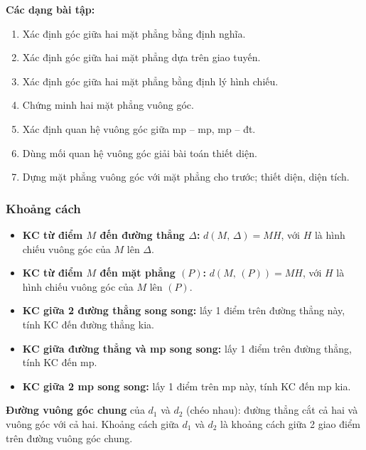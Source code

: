 \documentclass[12pt,a4paper]{article}
\begin{document}
\medskip\noindent\textbf{Các dạng bài tập:}
\begin{enumerate}[label=\textbf{Dạng \arabic*:}, leftmargin=*, align=left]
  \item Xác định góc giữa hai mặt phẳng bằng định nghĩa.
  \item Xác định góc giữa hai mặt phẳng dựa trên giao tuyến.
  \item Xác định góc giữa hai mặt phẳng bằng định lý hình chiếu.
  \item Chứng minh hai mặt phẳng vuông góc.
  \item Xác định quan hệ vuông góc giữa mp -- mp, mp -- đt.
  \item Dùng mối quan hệ vuông góc giải bài toán thiết diện.
  \item Dựng mặt phẳng vuông góc với mặt phẳng cho trước; thiết diện, diện tích.
\end{enumerate}

\subsubsection{Khoảng cách}

\begin{dinhnghia}
  \begin{itemize}
    \item \textbf{KC từ điểm $M$ đến đường thẳng $\Delta$:}
      $d(M,\,\Delta) = MH$, với $H$ là hình chiếu vuông góc của $M$ lên $\Delta$.
    \item \textbf{KC từ điểm $M$ đến mặt phẳng $(P)$:}
      $d(M,\,(P)) = MH$, với $H$ là hình chiếu vuông góc của $M$ lên $(P)$.
    \item \textbf{KC giữa 2 đường thẳng song song:}
      lấy 1 điểm trên đường thẳng này, tính KC đến đường thẳng kia.
    \item \textbf{KC giữa đường thẳng và mp song song:}
      lấy 1 điểm trên đường thẳng, tính KC đến mp.
    \item \textbf{KC giữa 2 mp song song:}
      lấy 1 điểm trên mp này, tính KC đến mp kia.
  \end{itemize}
\end{dinhnghia}

\begin{dinhnghia}[title={Khoảng cách giữa 2 đường chéo nhau}]
  \textbf{Đường vuông góc chung} của $d_1$ và $d_2$ (chéo nhau): đường thẳng cắt cả hai và vuông góc với cả hai. Khoảng cách giữa $d_1$ và $d_2$ là khoảng cách giữa 2 giao điểm trên đường vuông góc chung.
\end{dinhnghia}
\end{document}
